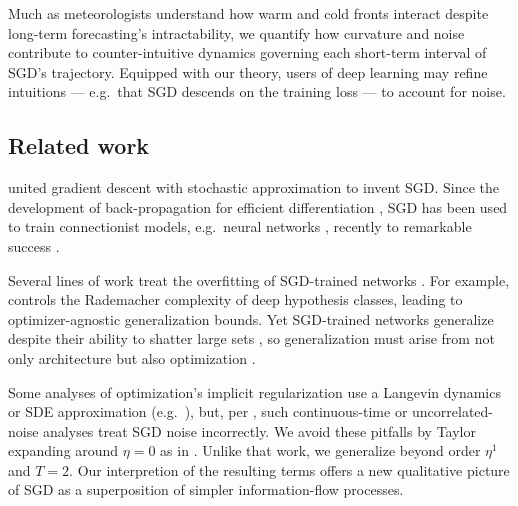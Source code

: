                 Much as meteorologists understand how warm and cold fronts
                interact despite long-term forecasting's intractability, we
                quantify how curvature and noise contribute to
                counter-intuitive dynamics governing each short-term interval
                of SGD's trajectory.  Equipped with our theory, users of deep
                learning may refine intuitions --- e.g.\ that SGD descends on
                the training loss --- to account for noise.

        \subsection{Related work}\label{sect:related}
    

            \cite{ki52} united gradient descent \citep{ca47} with stochastic
            approximation \citep{ro51} to invent SGD.  Since the development of
            back-propagation for efficient differentiation \citep{we74}, SGD
            has been used to train connectionist models, e.g.\ neural networks
            \citep{bo91}, recently to remarkable success \citep{le15}.
        
        
            Several lines of work treat the overfitting of SGD-trained networks
            \citep{ne17a}.  For example, \cite{ba17} controls the Rademacher
            complexity of deep hypothesis classes, leading to
            optimizer-agnostic generalization bounds.  Yet SGD-trained networks
            generalize despite their ability to shatter large sets
            \citep{zh17}, so generalization must arise from not only
            architecture but also optimization \citep{ne17b}.  

            Some analyses of optimization's implicit regularization use a
            Langevin dynamics or SDE approximation (e.g.\ \cite{ch18,zh19}),
            but, per \cite{ya19a}, such continuous-time or uncorrelated-noise
            analyses treat SGD noise incorrectly.
            We avoid these pitfalls by Taylor expanding around $\eta=0$ as in
            \cite{ro18}.  Unlike that work, we generalize beyond order $\eta^1$
            and $T=2$.  %
            Our interpretion of the resulting
            terms offers a new qualitative picture of SGD as a superposition of
            simpler information-flow processes.
            
